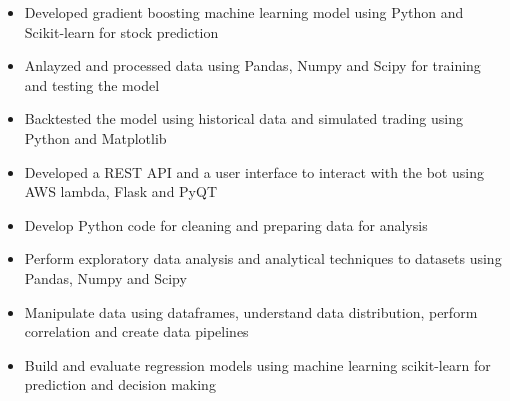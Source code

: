 \documentclass[11pt,a4paper,ragged2e]{altacv}
\begin{document}
\begin{paracol}{1}
\begin{itemize}
\item Developed gradient boosting machine learning model using Python and Scikit-learn for stock prediction
\item Anlayzed and processed data using Pandas, Numpy and Scipy for training and testing the model 
\item Backtested the model using historical data and simulated trading using Python and Matplotlib
\item Developed a REST API and a user interface to interact with the bot using AWS lambda, Flask and PyQT
\end{itemize}




\medskip

\begin{itemize}
\item Develop Python code for cleaning and preparing data for analysis 
\item Perform exploratory data analysis and analytical techniques to datasets using Pandas, Numpy and Scipy
\item Manipulate data using dataframes, understand data distribution, perform correlation and create data pipelines
\item Build and evaluate regression models using machine learning scikit-learn for prediction and decision making
\end{itemize}
\tightdivider


\end{paracol}
\end{document}
